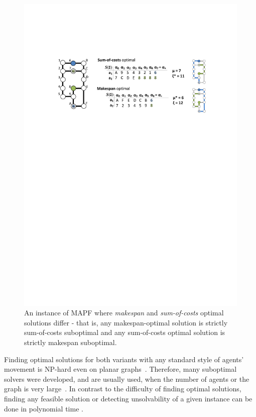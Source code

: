 \documentclass[jair,oneside,11pt]{article}
\begin{document}
\begin{figure}[t]
\centering
\includegraphics[trim={2.5cm 19.0cm 1.5cm 5.3cm},clip,width=1.0\textwidth]{fig_MAKEvsCOST.pdf}
\caption{An instance of MAPF where {\em makespan} and {\em
sum-of-costs} optimal solutions differ - that is, any makespan-optimal solution
is strictly sum-of-costs suboptimal and any sum-of-costs optimal solution is strictly makespan suboptimal.}
\label{figure-MAKEvsCOST}
\end{figure}

Finding optimal solutions for both variants with any standard style of agents' movement is
NP\nobreakdash-hard even on planar graphs~\cite{DBLP:conf/aaai/RatnerW86,DBLP:journals/jsc/RatnerW90,DBLP:conf/aaai/Surynek10,DBLP:journals/fuin/Surynek15,DBLP:conf/aaai/YuL13,DBLP:journals/ral/Yu16}. Therefore, many suboptimal solvers were developed, and are usually used, when the number of agents or the graph is very large~\cite{CohenUK15,KhorshidHS11,roger2012non,DBLP:conf/icra/Ryan10,DBLP:conf/aiide/Silver05,DBLP:journals/jair/WangB11}. In contrast to the difficulty of finding optimal solutions, finding any feasible solution or detecting unsolvability of a given instance can be done in polynomial time \cite{DBLP:journals/jair/WildeMW14,DBLP:conf/focs/KornhauserMS84,DBLP:conf/aaai/LunaB11,DBLP:conf/icra/Surynek09,DBLP:journals/ci/Surynek14}.
\end{document}
